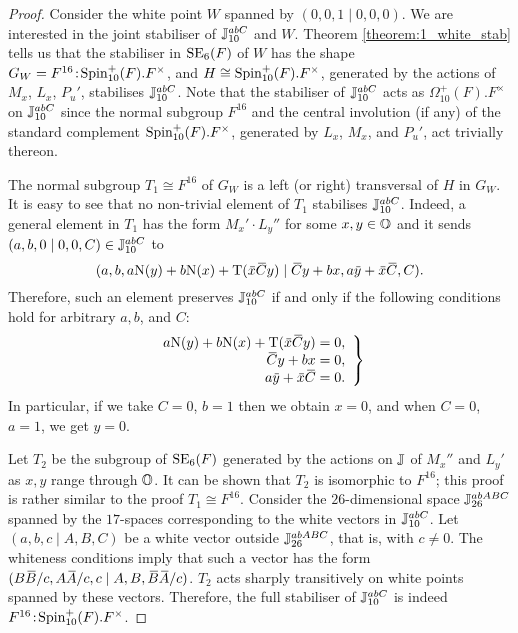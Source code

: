 \begin{proof}
	Consider the white point $W$ spanned by $(0,0,1 \mid 0,0,0)$. We are interested in the joint stabiliser of 
	$\mathbb{J}_{10}^{abC}$ and $W$. Theorem \ref{theorem:1_white_stab} tells us that the stabiliser in $\mathrm{SE}_6(F)$ of 
	$W$ has the shape $G_W = F^{16}\mathord{{\;\!{:}\;\!}}\mathrm{Spin}_{10}^+(F).F^{\times}$, and 
	$H \cong  \mathrm{Spin}_{10}^+(F).F^{\times}$, generated by the actions of $M_x$, $L_x$, $P_u'$, stabilises
	$\mathbb{J}_{10}^{abC}$. Note that the stabiliser of $\mathbb{J}_{10}^{abC}$ acts as  
	$\Omega_{10}^+(F).F^{\times}$ on $\mathbb{J}_{10}^{abC}$ since the normal subgroup $F^{16}$ and the 
	central involution (if any) of the standard complement $\mathrm{Spin}_{10}^+(F).F^{\times}$, generated
	by $L_x$, $M_x$, and $P_u'$, act trivially thereon. 
	
	The normal subgroup $T_1 \cong F^{16}$ of $G_W$ is a left (or right) transversal 
	of $H$ in $G_W$. It is easy to see that no non-trivial element of $T_1$ stabilises $\mathbb{J}_{10}^{abC}$. Indeed, a general
	element in $T_1$ has the form $M_x' \cdot L_y''$ for some $x,y \in \mathbb{O}$ and it sends \mbox{$(a,b,0 \mid 0,0,C) \in \mathbb{J}_{10}^{abC}$}
	to
	\begin{equation*}
		(a,b,a\NN(y) + b\NN(x) +  \Tr(\ovx \ovC y) \mid
			 \ovC y + bx, a\ovy + \ovx\ovC, C).
	\end{equation*}
	Therefore, such an element preserves $\mathbb{J}_{10}^{abC}$ if and only if the following conditions hold for arbitrary $a,b$, and $C$:
	\begin{equation*}
		\left.
		\begin{array}{r@{\;}c@{\;}l}
			a\NN(y) + b\NN(x) + \Tr(\ovx \ovC y) & = & 0, \\
			\ovC y + bx & = & 0, \\
			a\ovy + \ovx\ovC & = & 0.
		\end{array}
		\right\}
	\end{equation*}
	In particular, if we take $C = 0$, $b = 1$ then we obtain $x = 0$, and when $C = 0$, $a = 1$, we get $y = 0$. 
	
	Let $T_2$ be the subgroup of $\mathrm{SE}_6(F)$ generated by the actions on $\mathbb{J}$ of $M_x''$ and $L_y'$ as $x,y$ range through $\mathbb{O}$. 
	It can be shown that $T_2$ is isomorphic to $F^{16}$; this proof is rather similar to the proof $T_1 \cong F^{16}$. 
	Consider the $26$-dimensional space $\mathbb{J}_{26}^{abABC}$ spanned by the $17$-spaces corresponding to the white vectors in 
	$\mathbb{J}_{10}^{abC}$. Let $(a,b,c \mid A,B,C)$ be a white vector outside $\mathbb{J}_{26}^{abABC}$, that is, with $c \neq 0$. The whiteness conditions
	imply that such a vector has the form $(B\ovB / c, A\ovA/c, c \mid A, B, \ovB \ovA / c)$. $T_2$ acts sharply transitively on white points
	spanned by these vectors. Therefore, the full stabiliser of $\mathbb{J}_{10}^{abC}$ is indeed 
	$F^{16}\mathord{{\;\!{:}\;\!}}\mathrm{Spin}_{10}^+(F).F^{\times}$.
\end{proof}

